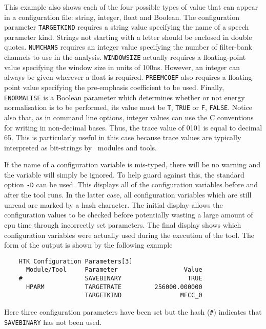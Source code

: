 This example also shows each of the four possible types of value that can
appear in a configuration file: string, 
integer, float and 
Boolean.
The configuration parameter \texttt{TARGETKIND}
 requires a string
value specifying the name of a speech parameter kind. Strings not
starting with a letter should be enclosed in double quotes. 
\texttt{NUMCHANS}  requires an 
integer value specifying the number of
filter-bank channels to use in the analysis.
\texttt{WINDOWSIZE}  actually requires a floating-point value
specifying  the window size in units of 100ns.  However, an integer
can always be given wherever a float is required.
\texttt{PREEMCOEF} also requires a floating-point  value specifying the
pre-emphasis coefficient to be used.  Finally, \texttt{ENORMALISE}
 is
a Boolean parameter  which determines whether or not energy
normalisation is to be performed, its value must be \texttt{T}, \texttt{TRUE} or
\texttt{F}, \texttt{FALSE}.  Notice also that, as in command line options,
integer values can use the C conventions for writing in non-decimal bases.
Thus, the trace value of 0101 is equal to decimal 65.  This is particularly
useful in this
case because trace values are typically interpreted as bit-strings by
\HTK\ modules and tools.

If the name of a configuration variable is mis-typed, there will be no
warning and the variable will simply be ignored.  To help guard
against this, the standard option \texttt{-D} can be used.  This
displays all of the configuration variables before and after the tool
runs.  In the latter case, all configuration variables which are still
unread are marked by a hash character.  The initial display allows the
configuration values to be checked before potentially wasting a large
amount of cpu time through incorrectly set parameters.  The final
display shows which configuration variables were actually used during
the execution of the tool.  The form of the output is shown by the
following example
\begin{verbatim}
    HTK Configuration Parameters[3]
      Module/Tool     Parameter                  Value
    #                 SAVEBINARY                  TRUE
      HPARM           TARGETRATE         256000.000000
                      TARGETKIND                MFCC_0
\end{verbatim}
Here three configuration parameters have been set but the hash
(\verb+#+) indicates that \texttt{SAVEBINARY} has not been used.

